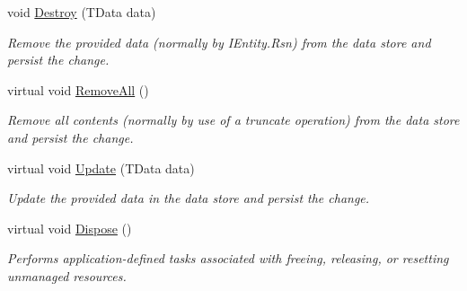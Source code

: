 \begin{DoxyCompactItemize}
void \hyperlink{classCqrs_1_1Mongo_1_1DataStores_1_1MongoDataStore_af97319aef1f0484666d9ea12578b8df9_af97319aef1f0484666d9ea12578b8df9}{Destroy} (T\+Data data)
\begin{DoxyCompactList}\small\item\em Remove the provided {\itshape data}  (normally by I\+Entity.\+Rsn) from the data store and persist the change. \end{DoxyCompactList}\item 
virtual void \hyperlink{classCqrs_1_1Mongo_1_1DataStores_1_1MongoDataStore_a878966ea796321cae54c3c619e3178d5_a878966ea796321cae54c3c619e3178d5}{Remove\+All} ()
\begin{DoxyCompactList}\small\item\em Remove all contents (normally by use of a truncate operation) from the data store and persist the change. \end{DoxyCompactList}\item 
virtual void \hyperlink{classCqrs_1_1Mongo_1_1DataStores_1_1MongoDataStore_a03aac0495445d34f124db893cd09cbd8_a03aac0495445d34f124db893cd09cbd8}{Update} (T\+Data data)
\begin{DoxyCompactList}\small\item\em Update the provided {\itshape data}  in the data store and persist the change. \end{DoxyCompactList}\item 
virtual void \hyperlink{classCqrs_1_1Mongo_1_1DataStores_1_1MongoDataStore_a4af729196a5fa4962961c9ce38b74891_a4af729196a5fa4962961c9ce38b74891}{Dispose} ()
\begin{DoxyCompactList}\small\item\em Performs application-\/defined tasks associated with freeing, releasing, or resetting unmanaged resources. \end{DoxyCompactList}\end{DoxyCompactItemize}
